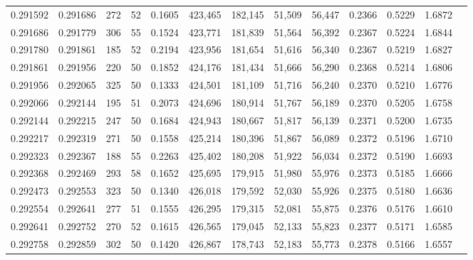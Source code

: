 \begin{tabular}{rrrrrrrrrrrrr}
0.291592 & 0.291686 &   272 &  52 &                                     0.1605 & 423,465 & 182,145 &  51,509 &  56,447 & 0.2366 & 0.5229 & 1.6872 \\
0.291686 & 0.291779 &   306 &  55 &                                     0.1524 & 423,771 & 181,839 &  51,564 &  56,392 & 0.2367 & 0.5224 & 1.6844 \\
0.291780 & 0.291861 &   185 &  52 &                                     0.2194 & 423,956 & 181,654 &  51,616 &  56,340 & 0.2367 & 0.5219 & 1.6827 \\
0.291861 & 0.291956 &   220 &  50 &                                     0.1852 & 424,176 & 181,434 &  51,666 &  56,290 & 0.2368 & 0.5214 & 1.6806 \\
0.291956 & 0.292065 &   325 &  50 &                                     0.1333 & 424,501 & 181,109 &  51,716 &  56,240 & 0.2370 & 0.5210 & 1.6776 \\
0.292066 & 0.292144 &   195 &  51 &                                     0.2073 & 424,696 & 180,914 &  51,767 &  56,189 & 0.2370 & 0.5205 & 1.6758 \\
0.292144 & 0.292215 &   247 &  50 &                                     0.1684 & 424,943 & 180,667 &  51,817 &  56,139 & 0.2371 & 0.5200 & 1.6735 \\
0.292217 & 0.292319 &   271 &  50 &                                     0.1558 & 425,214 & 180,396 &  51,867 &  56,089 & 0.2372 & 0.5196 & 1.6710 \\
0.292323 & 0.292367 &   188 &  55 &                                     0.2263 & 425,402 & 180,208 &  51,922 &  56,034 & 0.2372 & 0.5190 & 1.6693 \\
0.292368 & 0.292469 &   293 &  58 &                                     0.1652 & 425,695 & 179,915 &  51,980 &  55,976 & 0.2373 & 0.5185 & 1.6666 \\
0.292473 & 0.292553 &   323 &  50 &                                     0.1340 & 426,018 & 179,592 &  52,030 &  55,926 & 0.2375 & 0.5180 & 1.6636 \\
0.292554 & 0.292641 &   277 &  51 &                                     0.1555 & 426,295 & 179,315 &  52,081 &  55,875 & 0.2376 & 0.5176 & 1.6610 \\
0.292641 & 0.292752 &   270 &  52 &                                     0.1615 & 426,565 & 179,045 &  52,133 &  55,823 & 0.2377 & 0.5171 & 1.6585 \\
0.292758 & 0.292859 &   302 &  50 &                                     0.1420 & 426,867 & 178,743 &  52,183 &  55,773 & 0.2378 & 0.5166 & 1.6557 \\

\end{tabular}
